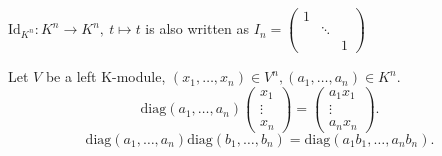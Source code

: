 \documentclass{book}
\numberwithin{equation}{section}
\begin{document}
\begin{exampleenv}
     $\mathrm{Id}_{K^n}:K^n\longrightarrow K^n,\ t\mapsto t$ is also written as $I_n=\begin{pmatrix}
  1&  & \\
  & \ddots  & \\
  &  &1
\end{pmatrix}$

Let $V$ be a left K-module, $(x_1,\dots,x_n)\in V^n, (a_1,\dots, a_n)\in K^n$.
$$\mathrm{diag}(a_1,\dots,a_n)\begin{pmatrix}
    x_1\\
    \vdots\\
    x_n
\end{pmatrix}=\begin{pmatrix}
    a_1x_1\\
    \vdots\\
    a_nx_n
\end{pmatrix}.$$
$$\mathrm{diag}(a_1,\dots,a_n)\mathrm{diag}(b_1,\dots,b_n)=\mathrm{diag}(a_1b_1,\dots,a_nb_n).$$
\end{exampleenv}
\end{document}
